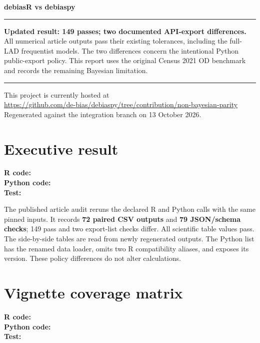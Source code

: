 \documentclass[10pt]{article}
\newenvironment{statusbox}
  {\begin{center}\begin{minipage}{0.88\textwidth}\hrule\vspace{0.7em}\color{passgreen}}
  {\vspace{0.7em}\hrule\end{minipage}\end{center}}
\begin{document}
\hypersetup{pageanchor=false}
\begin{titlepage}
\centering
\vspace*{1.25in}
{\Huge\bfseries debiasR vs debiaspy\par}
\vfill
\begin{statusbox}
\textbf{Updated result: 149 passes; two documented API-export differences.}\\[0.3em]
All numerical article outputs pass their existing tolerances, including the
full-LAD frequentist models. The two differences concern the intentional
Python public-export policy. This report uses the original Census 2021 OD
benchmark and records the remaining Bayesian limitation.
\end{statusbox}
\vfill
{\small
This project is currently hosted at\\[0.15em]
\url{https://github.com/de-bias/debiaspy/tree/contribution/non-bayesian-parity}\\[0.35em]
Regenerated against the integration branch on 13 October 2026.\par}
\end{titlepage}
\hypersetup{pageanchor=true}
{\footnotesize\setlength{\parskip}{0pt}\tableofcontents}
\clearpage
{}

\section{Executive result}
{\footnotesize \textbf{R code:} \\ \textbf{Python code:} \\ \textbf{Test:} \par}


The published article audit reruns the declared R and Python calls with the
same pinned inputs. It records \textbf{72 paired CSV outputs} and
\textbf{79 JSON/schema checks}; 149 pass and two export-list checks differ. All scientific table values
pass. The side-by-side tables are read from newly regenerated outputs. The
Python list has the renamed data loader, omits two R compatibility aliases,
and exposes its version. These policy differences do not alter calculations.

\section{Vignette coverage matrix}
{\footnotesize \textbf{R code:} \\ \textbf{Python code:} \\ \textbf{Test:} \par}
\end{document}
